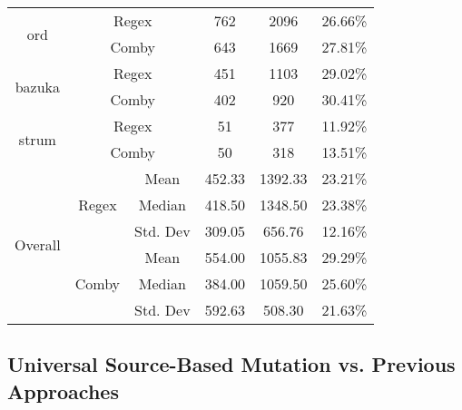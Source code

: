 \documentclass[sigconf,review, anonymous]{acmart}
\begin{document}
{\begin{table}[hbtp]
{\begin{tabular}{|c|c|c|c|c|c|}
\multirow{2}{*}{ord} & \multicolumn{2}{c|}{Regex} & 762	& 2096 & 26.66\% \\\cline{2-6}
    & \multicolumn{2}{c|}{Comby} & 643 & 1669 & 27.81\% \\ \hline
\multirow{2}{*}{bazuka} & \multicolumn{2}{c|}{Regex} & 451 & 1103 & 29.02\% \\\cline{2-6}
    & \multicolumn{2}{c|}{Comby} & 402 & 920 & 30.41\% \\ \hline
\multirow{2}{*}{strum} & \multicolumn{2}{c|}{Regex} & 51 & 377	& 11.92\% \\\cline{2-6}
    & \multicolumn{2}{c|}{Comby} & 50 & 318	& 13.51\% \\ \hline

\multirow{6}{*}{Overall} & \multirow{3}{*}{Regex} & Mean & 452.33 & 1392.33	& 23.21\%\\\cline{3-6}
    &   &  Median & 418.50 & 1348.50 & 23.38\%  \\\cline{3-6}
    &   &  Std. Dev & 309.05 & 656.76 & 12.16\%  \\\cline{2-6}

 & \multirow{3}{*}{Comby} & Mean & 554.00 & 1055.83	& 29.29\% \\\cline{3-6}
    &   &  Median & 384.00 & 1059.50	& 25.60\%  \\\cline{3-6}
    &   &  Std. Dev & 592.63 & 508.30 & 21.63\%  \\\hline


\end{tabular}

}
\end{table}



\subsection{Universal Source-Based Mutation vs. Previous Approaches}



\begin{table}[htbp]
\centering
\caption{C++ (UniversalMutator vs. Dextool)}
\label{tab:table_cpp2}
\end{table}}
\end{document}
